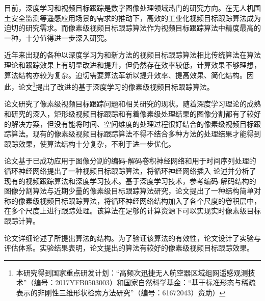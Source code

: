 
\begin{cabstract}
	目前，深度学习和视频目标跟踪是数字图像处理领域热门的研究方向。在无人机国土安全监测等遥感应用场景的需求的推动下，高效的工业化视频目标跟踪算法成为迫切的研究需求。而像素级视频目标跟踪算法作为视频目标跟踪算法中精度最高的一种，十分值得进一步深入研究。
	\par
	近年来出现的各种以深度学习为和新方法的视频目标跟踪算法相比传统算法在算法理论和跟踪效果上有明显改进和提升，但仍然存在效率较低，计算效果不够理想，算法结构亦较为复杂。迫切需要算法革新以提升效率、提高效果、简化结构。因此，论文\footnote{本研究得到国家重点研发计划：“高频次迅捷无人航空器区域组网遥感观测技术”（编号：2017YFB0503003）和国家自然科学基金：“基于标准形态与稀疏表示的非刚性三维形状检索方法研究”（编号：61672043）资助）}提出了改进的基于深度学习的像素级视频目标跟踪算法。
	\par
	论文研究了像素级视频目标跟踪问题和相关研究的现状。随着深度学习理论的成熟和研究的深入，矩形级视频目标跟踪和有着像素级处理结果的图像分割都有了较好的解决方案，但没有能将时间、空间维度的处理过程很好结合的像素级视频目标跟踪算法。现有的像素级视频目标跟踪算法不得不结合多种方法的处理结果才能得到跟踪效果，使算法结构十分复杂，不利于进一步优化。
	\par
	论文基于已成功应用于图像分割的编码-解码卷积神经网络和用于时间序列处理的循环神经网络提出了一种视频目标跟踪算法，将循环神经网络插入
	论述并分析了现有的视频跟踪算法和深度学习技术。基于深度学习技术，参考编码-解码结构的图像分割算法与近期少量的像素级目标跟踪算法研究，论文提出了一种结构简单对称的像素级视频目标跟踪算法，将循环神经网络结构加入了各个尺度的卷积层中，在多个尺度上进行跟踪处理。该算法在足够的计算资源下可以实现实时像素级目标跟踪计算。
	\par
	论文详细论述了所提出算法的结构。为了验证该算法的有效性，论文设计了实验与评估体系。实验结果表明，论文提出的算法有较好的像素级视频目标跟踪效果。
\end{cabstract}

